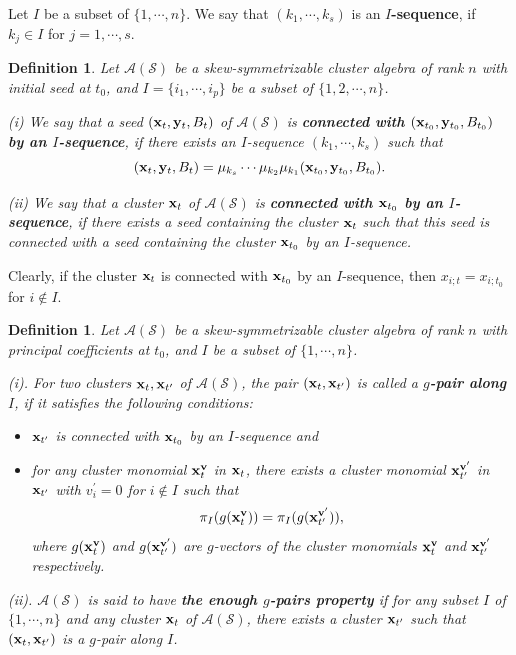\documentclass[14pt]{amsart}
\newtheorem{Definition}[Theorem]{Definition}
\begin{document}
Let $I$ be a subset of $\{1,\cdots,n\}$. We say that $(k_1,\cdots,k_s)$ is an {\bf $I$-sequence}, if $k_j\in I$ for $j=1,\cdots,s$.



\begin{Definition}
Let $\mathcal A(\mathcal S)$ be a skew-symmetrizable cluster algebra of rank $n$ with initial seed at $t_0$, and  $I=\{i_1,\cdots,i_p\}$ be a subset of $\{1,2,\cdots,n\}$.


(i) We say that a seed $({\bf x}_t,{\bf y}_t, B_t)$  of $\mathcal A(\mathcal S)$ is {\bf connected with $({\bf x}_{t_0}, {\bf y}_{t_0}, B_{t_0})$ by an $I$-sequence}, if there exists an $I$-sequence $(k_1,\cdots, k_s)$ such that $$({\bf x}_t,{\bf y}_t, B_t)=\mu_{k_s}\cdots\mu_{k_2}\mu_{k_1}({\bf x}_{t_0}, {\bf y}_{t_0}, B_{t_0}).$$


(ii) We say that a cluster ${\bf x}_t$ of $\mathcal A(\mathcal S)$ is {\bf connected with ${\bf x}_{t_0}$ by an $I$-sequence}, if there exists a seed containing the cluster ${\bf x}_t$ such that this seed is connected with
a seed containing the cluster ${\bf x}_{t_0}$ by an $I$-sequence.
\end{Definition}
Clearly, if the cluster ${\bf x}_t$ is connected with ${\bf x}_{t_0}$ by an $I$-sequence, then $x_{i;t}=x_{i;t_0}$ for $i\notin I$.



\begin{Definition}\label{maindef}
Let $\mathcal A(\mathcal S)$ be a skew-symmetrizable cluster algebra of rank $n$ with principal coefficients at $t_0$, and  $I$ be a subset of $\{1,\cdots,n\}$.

(i).  For two clusters ${\bf x}_t,{\bf x}_{t^\prime}$ of $\mathcal A(\mathcal S)$, the pair $({\bf x}_t,{\bf x}_{t^\prime})$ is called a {\bf $g$-pair along $I$}, if it satisfies the following  conditions:
\begin{itemize}
\item ${\bf x}_{t^\prime}$ is connected with ${\bf x}_{t_0}$ by an $I$-sequence and

\item for any cluster monomial ${\bf x}_t^{\bf v}$ in ${\bf x}_t$, there exists a cluster monomial ${\bf x}_{t^{\prime}}^{{\bf v}^{\prime}}$ in ${\bf x}_{t^{\prime}}$ with $v_i^{\prime}=0$ for $i\notin I$
  such that
$$\pi_I(g({\bf x}_t^{\bf v}))=\pi_I(g({\bf x}_{t^{\prime}}^{{\bf v}^{\prime}})),$$
where $g({\bf x}_t^{\bf v})$ and $g({\bf x}_{t^{\prime}}^{{\bf v}^{\prime}})$ are $g$-vectors of the cluster monomials
${\bf x}_t^{\bf v}$ and ${\bf x}_{t^{\prime}}^{{\bf v}^{\prime}}$ respectively.
\end{itemize}

(ii). $\mathcal A(\mathcal S)$ is said to have  {\bf the enough $g$-pairs property} if for  any subset $I$ of $\{1,\cdots,n\}$ and any cluster ${\bf x}_t$ of $\mathcal A(\mathcal S)$, there exists a cluster ${\bf x}_{t^\prime}$ such that $({\bf x}_t,{\bf x}_{t^\prime})$ is  a $g$-pair along $I$.
\end{Definition}
\end{document}
